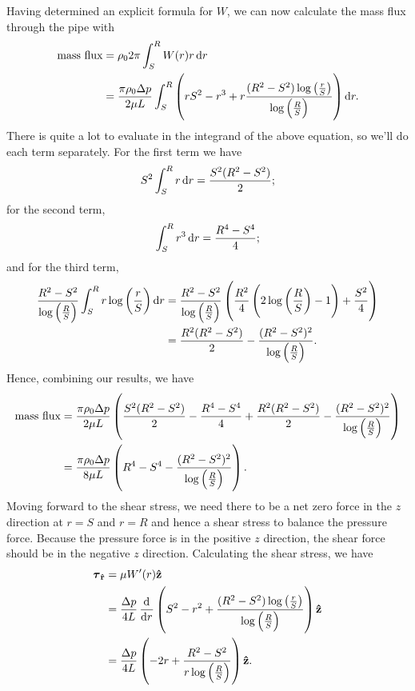 \documentclass{article}
\newcommand{\rhat}{\mathbf{\hat{r}}}
\newcommand{\zhat}{\mathbf{\hat{z}}}
\newcommand{\tauvec}{\boldsymbol{\tau}}
\begin{document}
Having determined an explicit formula for $W$, we can now calculate the
mass flux through the pipe with
%
\begin{align*}
    \text{mass flux}
        &= \rho_0 2 \pi \int_S^R W(r) r \dif r \\
        &= \frac{\pi \rho_0 \Delta p}{2 \mu L}
            \int_S^R
                \del{r S^2 - r^3 + r \frac{(R^2 - S^2) \log\del{\frac{r}{S}}}{\log\del{\frac{R}{S}}}}
            \dif r
        .
\end{align*}
%
There is quite a lot to evaluate in the integrand of the above equation,
so we'll do each term separately. For the first term we have
%
\begin{equation*}
    S^2  \int_S^R r \dif r = \frac{S^2 (R^2 - S^2)}{2}
    ;
\end{equation*}
%
for the second term,
%
\begin{equation*}
    \int_S^R r^3 \dif r = \frac{R^4 - S^4}{4}
    ;
\end{equation*}
%
and for the third term,
%
\begin{align*}
    \frac{R^2 - S^2}{\log\del{\frac{R}{S}}}
    \int_S^R r \log\del{\frac{r}{S}} \dif r
    &=
    \frac{R^2 - S^2}{\log\del{\frac{R}{S}}}
    \del{\frac{R^2}{4} \del{2 \log\del{\frac{R}{S}} - 1} + \frac{S^2}{4}}
    \\
    &= \frac{R^2 (R^2 - S^2)}{2} - \frac{(R^2 - S^2)^2}{\log\del{\frac{R}{S}}}
    .
\end{align*}
%
Hence, combining our results, we have
%
\begin{align*}
    \text{mass flux}
        &= \frac{\pi \rho_0 \Delta p}{2 \mu L}
            \del{
                \frac{S^2 (R^2 - S^2)}{2}
                - \frac{R^4 - S^4}{4}
                + \frac{R^2 (R^2 - S^2)}{2}
                - \frac{(R^2 - S^2)^2}{\log\del{\frac{R}{S}}}
            } \\
        &= \frac{\pi \rho_0 \Delta p}{8 \mu L}
            \del{
                R^4 - S^4
                - \frac{(R^2 - S^2)^2}{\log\del{\frac{R}{S}}}
            }
      .
\end{align*}
%
Moving forward to the shear stress, we need there to be a net zero force
in the $z$ direction at $r = S$ and $r = R$ and hence a shear stress to
balance the pressure force. Because the pressure force is in the
positive $z$ direction, the shear force should be in the negative $z$
direction. Calculating the shear stress, we have
%
\begin{align*}
    \tauvec_\rhat
        &= \mu W^\prime(r) \zhat \\
        &= \frac{\Delta p}{4 L} \dod{}{r} \del{S^2 - r^2 + \frac{(R^2 - S^2) \log\del{\frac{r}{S}}}{\log\del{\frac{R}{S}}}} \zhat \\
        &= \frac{\Delta p}{4 L} \del{- 2 r + \frac{R^2 - S^2}{r \log\del{\frac{R}{S}}}} \zhat
        .
\end{align*}
\end{document}
